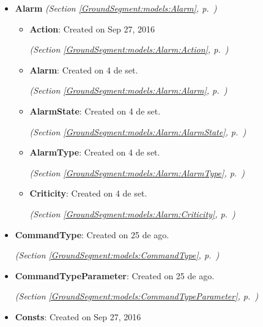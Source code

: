 \begin{itemize}
\setlength{\parskip}{0ex}
\item \textbf{Alarm}
  \textit{(Section \ref{GroundSegment:models:Alarm}, p.~\pageref{GroundSegment:models:Alarm})}

  \begin{itemize}
\setlength{\parskip}{0ex}
    \item \textbf{Action}: 
Created on Sep 27, 2016




  \textit{(Section \ref{GroundSegment:models:Alarm:Action}, p.~\pageref{GroundSegment:models:Alarm:Action})}

    \item \textbf{Alarm}: 
Created on 4 de set. 


  \textit{(Section \ref{GroundSegment:models:Alarm:Alarm}, p.~\pageref{GroundSegment:models:Alarm:Alarm})}

    \item \textbf{AlarmState}: 
Created on 4 de set. 


  \textit{(Section \ref{GroundSegment:models:Alarm:AlarmState}, p.~\pageref{GroundSegment:models:Alarm:AlarmState})}

    \item \textbf{AlarmType}: 
Created on 4 de set. 


  \textit{(Section \ref{GroundSegment:models:Alarm:AlarmType}, p.~\pageref{GroundSegment:models:Alarm:AlarmType})}

    \item \textbf{Criticity}: 
Created on 4 de set. 


  \textit{(Section \ref{GroundSegment:models:Alarm:Criticity}, p.~\pageref{GroundSegment:models:Alarm:Criticity})}

  \end{itemize}
\item \textbf{CommandType}: 
Created on 25 de ago. 


  \textit{(Section \ref{GroundSegment:models:CommandType}, p.~\pageref{GroundSegment:models:CommandType})}

\item \textbf{CommandTypeParameter}: 
Created on 25 de ago. 


  \textit{(Section \ref{GroundSegment:models:CommandTypeParameter}, p.~\pageref{GroundSegment:models:CommandTypeParameter})}

\item \textbf{Consts}: 
Created on Sep 27, 2016





\end{itemize}
